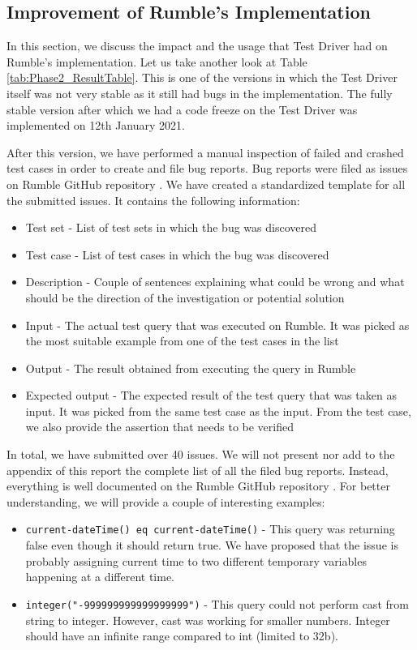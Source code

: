 \subsection{Improvement of Rumble's Implementation}
In this section, we discuss the impact and the usage that Test Driver had on Rumble's implementation. Let us take another look at Table \ref{tab:Phase2_ResultTable}. This is one of the versions in which the Test Driver itself was not very stable as it still had bugs in the implementation. The fully stable version after which we had a code freeze on the Test Driver was implemented on 12th January 2021. 

After this version, we have performed a manual inspection of failed and crashed test cases in order to create and file bug reports. Bug reports were filed as issues on Rumble GitHub repository \cite{RumbleRepository}. We have created a standardized template for all the submitted issues. It contains the following information:
\begin{itemize}
	\item Test set - List of test sets in which the bug was discovered
	\item Test case - List of test cases in which the bug was discovered
	\item Description - Couple of sentences explaining what could be wrong and what should be the direction of the investigation or potential solution
	\item Input - The actual test query that was executed on Rumble. It was picked as the most suitable example from one of the test cases in the list
	\item Output - The result obtained from executing the query in Rumble
	\item Expected output - The expected result of the test query that was taken as input. It was picked from the same test case as the input. From the test case, we also provide the assertion that needs to be verified
\end{itemize}

In total, we have submitted over 40 issues. We will not present nor add to the appendix of this report the complete list of all the filed bug reports. Instead, everything is well documented on the Rumble GitHub repository \cite{IssuesSubmitted}. For better understanding, we will provide a couple of interesting examples:
\begin{itemize}
	\item \texttt{current-dateTime() eq current-dateTime()} - This query was returning false even though it should return true. We have proposed that the issue is probably assigning current time to two different temporary variables happening at a different time.
	\item \texttt{integer("-999999999999999999")} - This query could not perform cast from string to integer. However, cast was working for smaller numbers. Integer should have an infinite range compared to int (limited to 32b).
\end{itemize}

